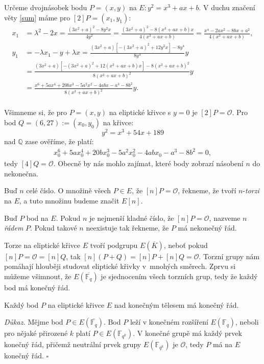 \documentclass[12pt]{report}
\begin{document}
\begin{priklad}\label{priklad2}
Určeme dvojnásobek bodu $P = (x,y)$ na $E : y^2 = x^3 + ax + b$. V duchu značení věty \ref{sum} máme pro $[2] P = (x_1,y_1)$:
\begin{align*}
x_1 &= \lambda^2 - 2x = \frac{(3x ^2 + a)^2 - 8 y^2 x }{4 y ^2} = \frac{(3x ^2 + a)^2 - 8 (x^3+ax+b) x }{4 (x^3+ax+b)} = \frac{x^4-2a x^2 - 8bx + a^2}{4 (x^3+ax+b)},\\
y_1 &=  - \lambda x_1 - y + \lambda x = \frac{(3x^2 + a)[-(3x ^2 + a)^2 + 12 y^2 x] - 8y^4}{8y^4} y \\
&=  \frac{(3x^2 + a)[-(3x ^2 + a)^2 + 12 (x^3 + ax + b) x] - 8 (x^3 + ax + b)^2}{8(x^3 + ax + b)^2} y\\
&= \frac{x^6 + 5 a x^4 + 20 b x^3 - 5 a^2 x^2 - 4ab x - a^3 - 8 b^2}{8(x^3 + ax + b)^2} y.  \\
\end{align*}
\end{priklad}


Všimneme si, že pro $P = (x,y)$ na eliptické křivce s $y=0$ je $[2] P = \mathcal{O}$. Pro bod $Q = (6,27) := (x_0,y_0)$ na křivce:
\begin{equation*}
y^2 = x^3 +54x+189
\end{equation*}
nad $\mathbb{Q}$ zase ověříme, že platí:
\begin{align*}
x_0^6 + 5 a x_0^4 + 20 b x_0^3 - 5 a^2 x_0^2 - 4ab x_0 - a^3 - 8 b^2 = 0,
\end{align*}
tedy $[4]Q = \mathcal{O}$. Obecně by nás mohlo zajímat, které body zobrazí násobení $n$ do nekonečna.


\begin{definice}
Buď $n$ celé číslo. O množině všech $P \in E$, že $[n] P = \mathcal{O}$, řekneme, že tvoří $n$-\textit{torzi} na $E$, a tuto množinu budeme značit $E[n]$.
\end{definice}

\begin{definice}
Buď $P$ bod na $E$. Pokud $n$ je nejmenší kladné číslo, že $[n]P = \mathcal{O}$, nazveme $n$ \textit{řádem} $P$. Pokud takové $n$ neexistuje tak řekneme, že $P$ má nekonečný řád.
\end{definice}

Torze na eliptické křivce $E$ tvoří podgrupu $E(\overline{K})$, neboť pokud $[n]P = \mathcal{O} = [n]Q$, tak $[n](P+Q) =[n]P+[n]Q=\mathcal{O}$. Torzní grupy nám pomáhají hlouběji studovat eliptické křivky v~mnohých směrech. Zprvu si můžeme všimnout, že $E(\overline{\mathbb{F}_q})$ je sjednocením všech torzních grup, tedy že každý bod má konečný řád.
\begin{veta}
Každý bod $P$ na eliptické křivce $E$ nad konečným tělesem má konečný řád.
\end{veta}
\noindent \textit{Důkaz. } Mějme bod $P \in E(\overline{\mathbb{F}_q})$. Bod $P$ leží v konečném rozšíření $E\left(\mathbb{F}_q\right)$, neboli pro nějaké přirozené $k$ platí $P \in E\left(\mathbb{F}_{q^k}\right)$. V konečné grupě má každý prvek konečný řád, přičemž neutrální prvek grupy $E\left(\mathbb{F}_{q^k}\right)$ je $\mathcal{O}$, tedy $P$ má na $E$ konečný řád. \hfill $\square$\\
\end{document}
